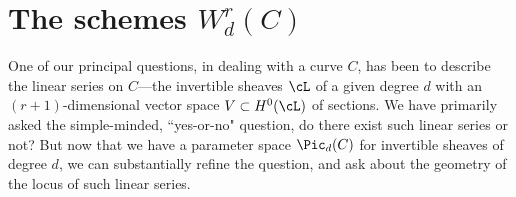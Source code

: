 %
%
%
%
%
%
%
%

\section{The schemes $W^r_d(C)$}

One of our principal questions, in dealing with a curve $C$, has been to describe the linear series on $C$---the invertible sheaves $\cL$ of a given degree $d$ with an $(r+1)$-dimensional  vector space $V \subset H^0(\cL)$ of sections. We have primarily asked the simple-minded, ``yes-or-no" question, do there exist such linear series or not? But now that we have a parameter space $\Pic_d(C)$ for invertible sheaves of degree $d$, we can substantially refine the question, and ask about the geometry of the locus of such linear series.

